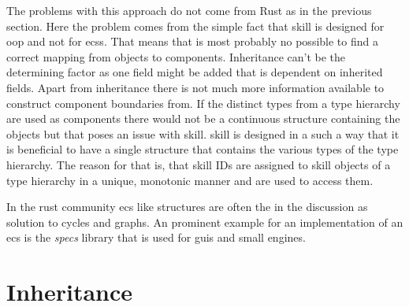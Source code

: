 \documentclass[thesis]{subfiles}
\begin{document}
    The problems with this approach do not come from Rust as in the previous section.
    Here the problem comes from the simple fact that \gls{skill} is designed for \gls{oop} and not for \glspl{ecs}.
    That means that is most probably no possible to find a correct mapping from objects to components.
    Inheritance can't be the determining factor as one field might be added that is dependent on inherited fields.
    Apart from inheritance there is not much more information available to construct component boundaries from.
    If the distinct types from a type hierarchy are used as components there would not be a continuous structure containing the objects but that poses an issue with \gls{skill}.
    \gls{skill} is designed in a such a way that it is beneficial to have a single structure that contains the various types of the type hierarchy.
    The reason for that is, that \gls{skill} IDs are assigned to \gls{skill} objects of a type hierarchy in a unique, monotonic manner and are used to access them.\autocite{skill-tr}

    In the rust community \gls{ecs} like structures are often the in the discussion as solution to cycles and graphs\autocites{rust-graph-r4cpp}{rust-graph-leipzig}{rust-graph-niko}{rust-graph-exyr}.
    An prominent example for an implementation of an \gls{ecs} is the \emph{specs}\autocite{rust-specs} library that is used for \glspl{gui}\autocite{rust-xi} and small engines\autocites{rust-amethyst}{rust-rhusics}.

\section{Inheritance}
  \newsavebox{\inheritanceJava}
  \begin{lrbox}{\inheritanceJava}%
    \begin{minipage}{.25\linewidth}
      
    \end{minipage}
  \end{lrbox}
\end{document}
